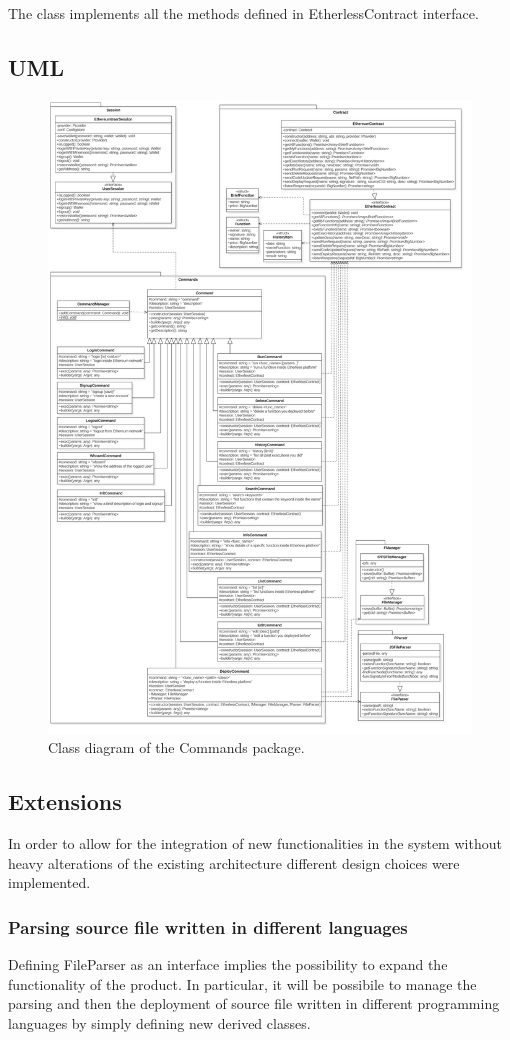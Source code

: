 					The class implements all the methods defined in EtherlessContract interface.
	
	\subsection{UML}
	\begin{figure} [H]
		\centering
		\includegraphics[width=0.85\linewidth]{diagrammi/etherless-cli/Classi}
		\caption{Class diagram of the Commands package.}
	\end{figure}
			
\subsection{Extensions}  
In order to allow for the integration of new functionalities in the system without heavy alterations of the existing architecture different design choices were implemented.

\subsubsection{Parsing source file written in different languages}
Defining FileParser as an interface implies the possibility to expand the functionality of the product. In particular, it will be possibile to manage the parsing and then the deployment of source file written in different programming languages by simply defining new derived classes. 

